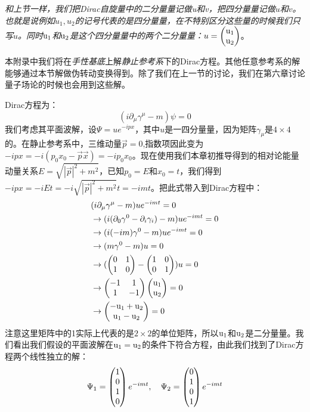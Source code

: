 {\it 和上节一样，我们把Dirac自旋量中的二分量量记做{\rm u}和{\rm v}，把四分量量记做$u$和$v$。也就是说例如$u_1,u_2$的记号代表的是四分量量，在不特别区分这些量的时候我们只写$u$。同时${\rm u_1}$和${\rm u_2}$是这个四分量量中的两个二分量量：$u=\begin{pmatrix} \rm u_1 \\ \rm u_2 \end{pmatrix} $}。
\par
本附录中我们将在{\it 手性基底}上解{\it 静止参考系}下的Dirac方程。其他任意参考系的解能够通过本节解做伪转动变换得到。除了我们在上一节的讨论，我们在第六章讨论量子场论的时候也会用到这些解。\par
Dirac方程为：
\begin{equation}
(i\partial_\mu \gamma^\mu -m)\psi=0
\end{equation}
我们考虑其平面波解，设$\Psi=ue^{-ipx}$，其中$u$是一四分量量，因为矩阵$\gamma_\mu$是$4 \times 4$的。在静止参考系中，三维动量$\vec{p}=0$,指数项因此变为$-ipx=-i(p_0x_0-\vec{p}\vec{x})=-ip_0x_0$。现在使用我们本章初推导得到的相对论能量动量关系$E=\sqrt{|\vec{p}|^2+m^2}$，已知$p_0=E$和$x_0=t$，我们得到$-ipx=-iEt=-i\sqrt{|\vec{p}|^2+m^2}t=-imt$。把此式带入到Dirac方程中：
\begin{equation}
\begin{split}
&(i\partial_\mu\gamma^\mu-m)ue^{-imt}=0\\
&\to (i(\partial_0\gamma^0-\partial_i\gamma_i)-m)ue^{-imt}=0\\
&\to (i(-im)\gamma^0-m)ue^{-imt}=0\\
&\to (m\gamma^0-m)u=0\\
&\to (\begin{pmatrix} 0 & 1 \\ 1 & 0 \end{pmatrix} -\begin{pmatrix} 1 & 0 \\ 0 & 1 \end{pmatrix})u=0\\
&\to \begin{pmatrix} -1 & 1 \\ 1 & -1 \end{pmatrix} \begin{pmatrix} \rm u_1 \\ \rm u_2 \end{pmatrix} =0\\
&\to \begin{pmatrix} \rm -u_1+u_2 \\ \rm u_1-u_2 \end{pmatrix} =0
\end{split}
\end{equation}
注意这里矩阵中的1实际上代表的是$2 \times 2$的单位矩阵，所以$\rm u_1$和$\rm u_2$是二分量量。我们看出我们假设的平面波解在$\rm u_1 =u_2$的条件下符合方程，由此我们找到了Dirac方程两个线性独立的解：
\begin{equation}
\Psi_1=\begin{pmatrix} 1\\0\\1\\0 \end{pmatrix} e^{-imt},~~~\Psi_2=\begin{pmatrix} 0\\1\\0\\1 \end{pmatrix} e^{-imt}
\end{equation}
